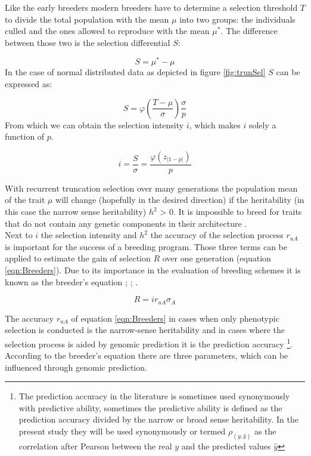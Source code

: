 Like the early breeders modern breeders have to determine a selection threshold $T$ to divide the
total population with the mean $\mu$ into two groups: the individuals culled and the ones allowed to
reproduce with the mean $\mu^{\ast}$. The difference between those two is the selection differential
$S$:

\begin{equation}
 S = \mu^{\ast} - \mu
\label{eqn:S}
\end{equation}
\noindent
In the case of normal distributed data as depicted in figure \ref{fig:trunSel} $S$ can be expressed as:

\begin{equation}
S = \varphi (\frac{T - \mu}{\sigma}) \frac{\sigma}{p}
\end{equation}
\noindent
From which we can obtain the selection intensity $i$, which makes $i$ solely a function of $p$.

\begin{equation}
i = \frac{S}{\sigma} = \frac{\varphi (z_{|1-p|})}{p}
\end{equation}

With recurrent truncation selection over many generations the population mean of the trait
$\mu$ will change (hopefully in the desired direction) if the heritability (in this case
the narrow sense heritability) $h^2$ > 0. It is impossible to breed for traits that do not
contain any genetic components in their architecture \cite{walsh2018}.\\
Next to $i$ the selection intensity and $h^2$ the accuracy of the selection process
$r_{uA}$ is important for the success of a breeding program. Those three terms can be
applied to estimate the gain of selection $R$ over one generation (equation
\ref{eqn:Breeders}). Due to its importance in the evaluation of breeding schemes it is
known as the breeder's equation \cite{mousseau1987natural}; \cite{falconer1996};
\cite{kingsolver2001strength}.

\begin{equation}
 R = i r_{uA} \sigma_A
\label{eqn:Breeders}
\end{equation}

The accuracy $r_{uA}$ of equation \ref{eqn:Breeders} in cases when only phenotypic
selection is conducted is the narrow-sense heritability and in cases where the selection
process is aided by genomic prediction it is the prediction accuracy \footnote{The
  prediction accuracy in the literature is sometimes used synonymously with predictive
  ability, sometimes the predictive ability is defined as the prediction accuracy divided
  by the narrow or broad sense heritability. In the present study they will be used
  synonymously or termed $\rho_{(y,\hat{y})}$ as the correlation after Pearson between the
  real $y$ and the predicted values $\hat{y}$}. According to the breeder's equation there
are three parameters, which can be influenced through genomic
prediction. \\

